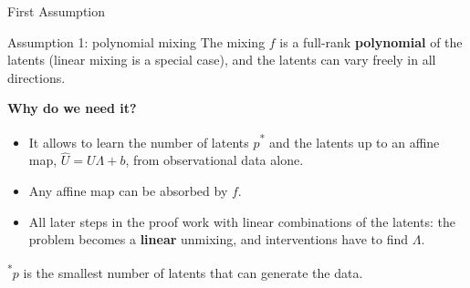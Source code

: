 \documentclass[11pt,aspectratio=169]{beamer}
\begin{document}
\begin{frame}{First Assumption}
	\begin{block}{Assumption 1: polynomial mixing}
		The mixing $f$ is a full-rank \textbf{polynomial} of the latents (linear mixing is a special case), and the latents can vary freely in all directions.
	\end{block}
	\bigskip
	\textbf{Why do we need it?}
	\begin{itemize}
		\item It allows to learn the number of latents $p$\textsuperscript{*} and the latents up to an affine map, $\hat U = U\Lambda + b$, from observational data alone.
		\item Any affine map can be absorbed by $f$.
		\item All later steps in the proof work with linear combinations of the latents: the problem becomes a \textbf{linear} unmixing, and interventions have to find $\Lambda$.
	\end{itemize}
	\par\vfill
	{\footnotesize \textsuperscript{*}$p$ is the smallest number of latents that can generate the data.}
\end{frame}
\end{document}
